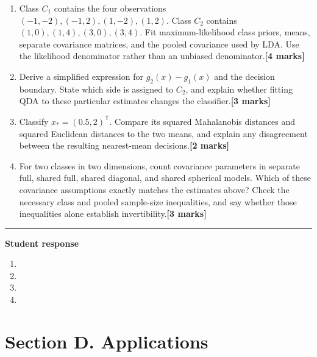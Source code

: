 \documentclass[11pt,a4paper]{article}
\newlength{\BlankAnswerHeight}\setlength{\BlankAnswerHeight}{16mm}
\newcommand{\AnswerBlank}{\leavevmode\par\vspace{\BlankAnswerHeight}}
\begin{document}
\begin{enumerate}[label=(\alph*),leftmargin=8mm,itemsep=3pt]
\item Class \(C_1\) contains the four observations \((-1,-2),(-1,2),(1,-2),(1,2)\). Class \(C_2\) contains \((1,0),(1,4),(3,0),(3,4)\). Fit maximum-likelihood class priors, means, separate covariance matrices, and the pooled covariance used by LDA. Use the likelihood denominator rather than an unbiased denominator.\hfill\textbf{[4 marks]}
\item Derive a simplified expression for \(g_2(x)-g_1(x)\) and the decision boundary. State which side is assigned to \(C_2\), and explain whether fitting QDA to these particular estimates changes the classifier.\hfill\textbf{[3 marks]}
\item Classify \(x_*=(0.5,2)^\mathsf T\). Compare its squared Mahalanobis distances and squared Euclidean distances to the two means, and explain any disagreement between the resulting nearest-mean decisions.\hfill\textbf{[2 marks]}
\item For two classes in two dimensions, count covariance parameters in separate full, shared full, shared diagonal, and shared spherical models. Which of these covariance assumptions exactly matches the estimates above? Check the necessary class and pooled sample-size inequalities, and say whether those inequalities alone establish invertibility.\hfill\textbf{[3 marks]}
\end{enumerate}\par\medskip\hrule\medskip\textbf{Student response}\par
\begin{enumerate}[label=(\alph*),leftmargin=8mm,itemsep=3pt]
\item
\AnswerBlank
\item
\AnswerBlank
\item
\AnswerBlank
\item
\AnswerBlank
\end{enumerate}
\newpage\section*{Section D. Applications}
\end{document}
